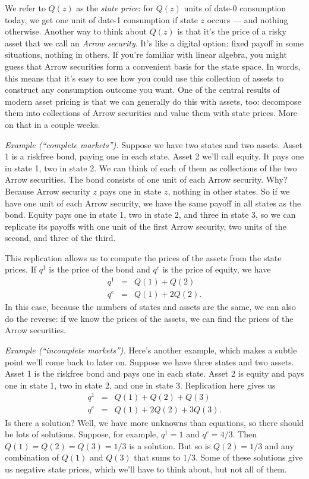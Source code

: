\documentclass[11pt]{article}
\begin{document}
We refer to $Q(z)$ as the {\it state price\/}:
for $Q(z)$ units of date-0 consumption today, we get one
unit of date-1 consumption if state $z$ occurs --- and nothing otherwise.
Another way to think about $Q(z)$ is that it's the price of a risky asset
that we call an {\it Arrow security\/}.
It's like a digital option:  fixed payoff in some situations, nothing in others.
If you're familiar with linear algebra,
you might guess that {Arrow securities}
form a convenient basis for the state space.
In words, this means that it's easy to see how you could
use this collection of assets to construct any consumption outcome you want.
One of the central results of modern asset pricing is that
we can generally do this with assets, too:  decompose them
into collections of Arrow securities and value them with state prices.
More on that in a couple weeks.

{\it Example (``complete markets'').\/}
Suppose we have two states and two assets.
Asset 1 is a riskfree bond, paying one in each state.
Asset 2 we'll call equity.  It pays one in state 1, two in state 2.
We can think of each of them as collections of the two Arrow securities.
The bond consists of one unit of each Arrow security.
Why?  Because Arrow security $z$ pays one in state $z$, nothing in other states.
So if we have one unit of each Arrow security,
we have the same payoff in all states as the bond.
Equity pays one in state 1, two in state 2, and three in state 3,
so we can replicate its payoffs with one unit of the first Arrow security,
two units of the second, and three of the third.

This replication allows us to compute the prices of the assets from the state prices.
If $q^1$ is the price of the bond and $q^e$ is the price of equity, we have
\begin{eqnarray*}
    q^1 &=& Q(1) + Q(2) \\
    q^e &=& Q(1) + 2 Q(2) .
\end{eqnarray*}
In this case, because the numbers of states and assets are the same,
we can also do the reverse:  if we know the prices of the assets,
we can find the prices of the Arrow securities.


{\it Example  (``incomplete markets'').\/}
Here's another example, which makes a subtle point we'll come
back to later on.
Suppose we have three states and two assets.
Asset 1 is the riskfree bond and pays one in each state.
Asset 2 is equity and pays one in state 1, two in state 2, and one in state 3.
Replication here gives us
\begin{eqnarray*}
    q^1 &=& Q(1) + Q(2) + Q(3) \\
    q^e &=& Q(1) + 2 Q(2) + 3 Q(3) .
\end{eqnarray*}
Is there a solution?
Well, we have more unknowns than equations, so there
should be lots of solutions.
Suppose, for example, $q^1 = 1 $ and $q^e = 4/3$.
Then $ Q(1) = Q(2) = Q(3) = 1/3$ is a solution.
But so is $Q(2) = 1/3$ and any combination of $Q(1)$ and $Q(3)$ that sums to 1/3.
Some of these solutions give us negative state prices,
which we'll have to think about, but not all of them.
\end{document}
